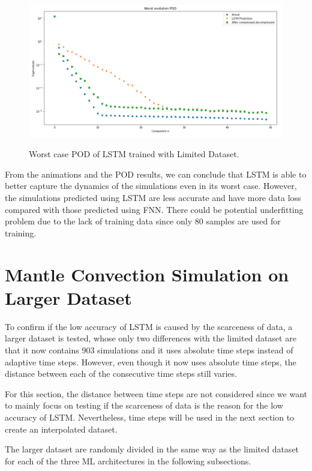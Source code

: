 \begin{figure}[H]
    \caption{Worst case POD of LSTM trained with Limited Dataset.}
    \includegraphics[scale=0.5]{figures/mantle_convection_images/limited_dataset/LSTM_Worst_POD.png}
    \label{figure:LSTM_limited_worst_POD}
\end{figure}

From the animations and the POD results, we can conclude that LSTM is able to better capture the dynamics of the simulations even in its worst case. However, the simulations predicted using LSTM are less accurate and have more data loss compared with those predicted using FNN. There could be potential underfitting problem due to the lack of training data since only 80 samples are used for training.


\section{Mantle Convection Simulation on Larger Dataset}

To confirm if the low accuracy of LSTM is caused by the scarceness of data, a larger dataset is tested, whose only two differences with the limited dataset are that it now contains 903 simulations and it uses absolute time steps instead of adaptive time steps. However, even though it now uses absolute time steps, the distance between each of the consecutive time steps still varies.

For this section, the distance between time steps are not considered since we want to mainly focus on testing if the scarceness of data is the reason for the low accuracy of LSTM. Nevertheless, time steps will be used in the next section to create an interpolated dataset.

The larger dataset are randomly divided in the same way as the limited dataset for each of the three ML architectures in the following subsections.

